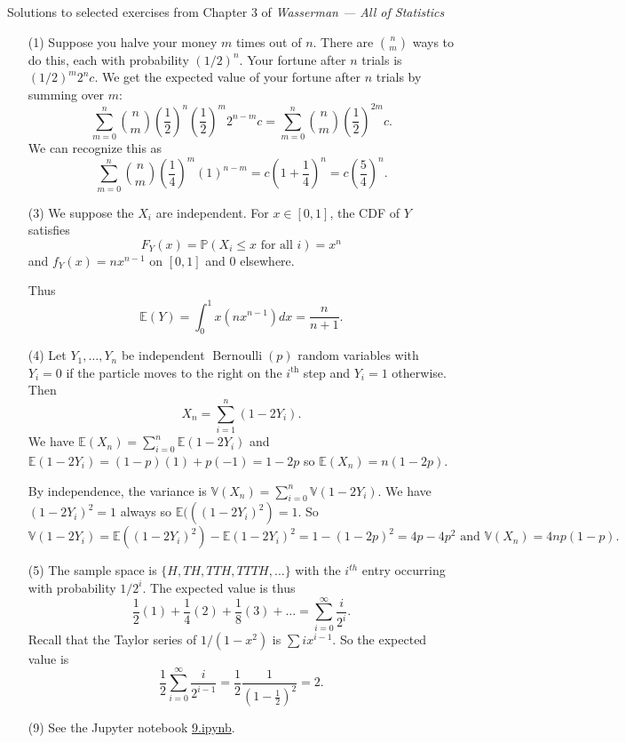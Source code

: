\documentclass[10pt]{article}
\renewcommand{\P}{\mathbb{P}}
\newcommand{\V}{\mathbb{V}}
\newcommand{\E}{\mathbb{E}}
\newcommand{\Bern}{\operatorname{Bernoulli}}
\begin{document}
\noindent \large{Solutions to selected exercises from Chapter 3 of
\emph{Wasserman --- All of Statistics}}

\begin{enumerate}
\item[(1)]
Suppose you halve your money $m$ times out of $n$. There are $\binom{n}{m}$
ways to do this, each with probability $(1/2)^n$. Your fortune after $n$
trials is $(1/2)^m2^nc$. We get the expected value of your fortune after $n$
trials by summing over $m$:
\[
\sum_{m=0}^n \binom{n}{m}\left(\frac{1}{2}\right)^n \left(\frac{1}{2}\right)^m2^{n-m}c
= \sum_{m=0}^n \binom{n}{m} \left(\frac{1}{2}\right)^{2m}c.
\]
We can recognize this as
\[
\sum_{m=0}^n \binom{n}{m} \left(\frac{1}{4}\right)^m(1)^{n-m} =
c\left(1+\frac{1}{4}\right)^n = c\left(\frac{5}{4}\right)^n.
\]

\item[(3)]
We suppose the $X_i$ are independent. For $x\in [0,1]$, the CDF of $Y$ satisfies
\[
F_Y(x)=\P(X_i\leq x \text{ for all } i)=x^n
\]
and $f_Y(x) = nx^{n-1}$ on $[0,1]$ and $0$ elsewhere.

Thus
\[
\E(Y) = \int_0^1 x (n x^{n-1}) dx =\frac{n}{n+1}.
\]

\item[(4)]
Let $Y_1,\ldots,Y_n$ be independent $\Bern(p)$ random variables with $Y_i=0$
if the particle moves to the right on the $i^{\text{th}}$ step and $Y_i=1$
otherwise. Then
\[
X_n = \sum_{i=1}^n (1-2Y_i).
\]
We have $\E(X_n) = \sum_{i=0}^n \E(1-2Y_i)$ and
$\E(1-2Y_i) = (1-p)(1) + p(-1)=1-2p$ so $\E(X_n)=n(1-2p)$.

By independence, the variance is $\V(X_n) = \sum_{i=0}^n \V(1-2Y_i)$.
We have $(1-2Y_i)^2=1$ always so $\E(((1-2Y_i)^2)=1$. So
\[
\V(1-2Y_i) = \E((1-2Y_i)^2) - \E(1-2Y_i)^2 = 1 - (1-2p)^2 = 4p-4p^2
\text{ and } \V(X_n) = 4np(1-p).
\]

\item[(5)]
The sample space is $\{H, TH, TTH, TTTH,\ldots\}$ with the $i^{th}$ entry
occurring with probability $1/2^i$. The expected value is thus
\[
\frac{1}{2}(1) + \frac{1}{4}(2) + \frac{1}{8}(3) + \ldots =
\sum_{i=0}^\infty \frac{i}{2^i}.
\]
Recall that the Taylor series of $1/(1-x^2)$ is $\sum i x^{i-1}$. So
the expected value is
\[
\frac{1}{2}\sum_{i=0}^\infty \frac{i}{2^{i-1}} =
\frac{1}{2} \frac{1}{(1-\frac{1}{2})^2} = 2.
\]

\item[(9)]
See the Jupyter notebook
\href{https://github.com/ajrasmus/some_of_statistics/blob/main/chapter_3/9.ipynb}{9.ipynb}.


\end{enumerate}
\end{document}

